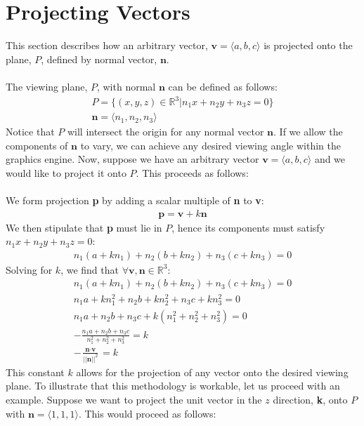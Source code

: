 \documentclass{article}
\begin{document}
\section{Projecting Vectors}
This section describes how an arbitrary vector, $\textbf{v} = \langle a,b,c \rangle$ is projected onto the plane, $P$, defined by normal vector,
$\textbf{n}$.\\\\
The viewing plane, $P$, with normal $\textbf{n}$ can be defined as follows:
\begin{gather*}
P = \{(x,y,z) \in \mathbb{R}^3 | n_1x + n_2y + n_3z = 0 \}\\
\textbf{n} = \langle n_1,n_2,n_3 \rangle
\end{gather*}
Notice that $P$ will intersect the origin for any normal vector $\textbf{n}$. If we allow the components of $\textbf{n}$ to vary, we can
achieve any desired viewing angle within the graphics engine. Now, suppose we have an arbitrary vector $\textbf{v} = \langle a,b,c \rangle$
and we would like to project it onto $P$. This proceeds as follows:
\\\\
We form projection \textbf{p} by adding a scalar multiple of \textbf{n} to \textbf{v}:
\begin{align*}
\textbf{p} = \textbf{v} + k\textbf{n}
\end{align*}
We then stipulate that \textbf{p} must lie in $P$, hence its components must satisfy $n_1x + n_2y + n_3z = 0$:
\begin{align*}
n_1(a+kn_1) + n_2(b+kn_2) + n_3(c+kn_3) = 0
\end{align*}
Solving for $k$, we find that $\forall \textbf{v}, \textbf{n} \in \mathbb{R}^3$:
\begin{align*}
n_1(a+kn_1) + n_2(b+kn_2) + n_3(c+kn_3) = 0\\
n_1a + kn_1^2 + n_2b + kn_2^2 + n_3c + kn_3^2 = 0\\
n_1a + n_2b + n_3c + k(n_1^2 + n_2^2 + n_3^2) = 0\\
-\frac{n_1a + n_2b + n_3c}{n_1^2 + n_2^2 + n_3^2} = k\\
-\frac{\textbf{n} \cdot \textbf{v}}{||\textbf{n}||^2} = k
\end{align*}
This constant $k$ allows for the projection of any vector onto the desired viewing plane. To illustrate that this methodology is workable,
let us proceed with an example. Suppose we want to project the unit vector in the $z$ direction, \textbf{k}, onto $P$ with $\textbf{n} =
\langle 1,1,1 \rangle$. This would proceed as follows:
\end{document}
